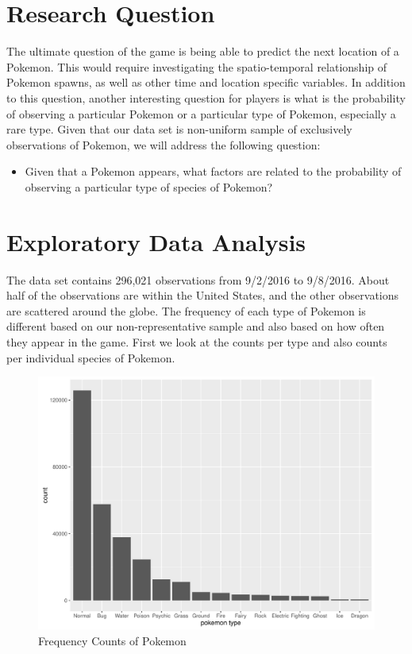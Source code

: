 \documentclass{article}
\begin{document}
\section{Research Question}

The ultimate question of the game is being able to predict the next location of a Pokemon. This would require investigating the spatio-temporal relationship of Pokemon spawns, as well as other time and location specific variables. In addition to this question, another interesting question for players is what is the probability of observing a particular Pokemon or a particular type of Pokemon, especially a rare type. Given that our data set is non-uniform sample of exclusively observations of Pokemon, we will address the following question:

\begin{itemize}

	\item Given that a Pokemon appears, what factors are related to the probability of observing a particular type of species of Pokemon?

\end{itemize}

\section{Exploratory Data Analysis}

The data set contains 296,021 observations from 9/2/2016 to 9/8/2016. About half of the observations are within the United States, and the other observations are scattered around the globe. The frequency of each type of Pokemon is different based on our non-representative sample and also based on how often they appear in the game. First we look at the counts per type and also counts per individual species of Pokemon.

\begin{figure}[H]
\centering
\includegraphics[scale = 0.4]{count_by_type.pdf}
\caption{Frequency Counts of Pokemon}
\end{figure}
\end{document}
